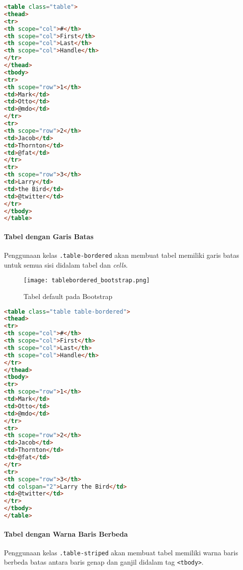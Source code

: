 \begin{lstlisting}[language=HTML,  basicstyle=\ttfamily, frame=single, columns=fullflexible, keepspaces=true, breaklines=true, showstringspaces=false, label={lst:tableBootstrap}, caption=Tabel pada bootstrap 4] 
<table class="table">
<thead>
<tr>
<th scope="col">#</th>
<th scope="col">First</th>
<th scope="col">Last</th>
<th scope="col">Handle</th>
</tr>
</thead>
<tbody>
<tr>
<th scope="row">1</th>
<td>Mark</td>
<td>Otto</td>
<td>@mdo</td>
</tr>
<tr>
<th scope="row">2</th>
<td>Jacob</td>
<td>Thornton</td>
<td>@fat</td>
</tr>
<tr>
<th scope="row">3</th>
<td>Larry</td>
<td>the Bird</td>
<td>@twitter</td>
</tr>
</tbody>
</table>
\end{lstlisting}

\paragraph{Tabel dengan Garis Batas}
Penggunaan kelas \texttt{.table-bordered} akan membuat tabel memiliki garis batas untuk semua sisi didalam tabel dan \textit{cells}.

\begin{figure} [H]
	\centering  
	\texttt{[image: tablebordered\_bootstrap.png]}  
	\caption{Tabel default pada Bootstrap} 
	\label{fig:tableBorderedBootstrap}
\end{figure}

\begin{lstlisting}[language=HTML,  basicstyle=\ttfamily, frame=single, columns=fullflexible, keepspaces=true, breaklines=true, showstringspaces=false, label={lst:tableborderedBootstrap}, caption=Kode tabel dengan garis batas pada bootstrap 4] 
<table class="table table-bordered">
<thead>
<tr>
<th scope="col">#</th>
<th scope="col">First</th>
<th scope="col">Last</th>
<th scope="col">Handle</th>
</tr>
</thead>
<tbody>
<tr>
<th scope="row">1</th>
<td>Mark</td>
<td>Otto</td>
<td>@mdo</td>
</tr>
<tr>
<th scope="row">2</th>
<td>Jacob</td>
<td>Thornton</td>
<td>@fat</td>
</tr>
<tr>
<th scope="row">3</th>
<td colspan="2">Larry the Bird</td>
<td>@twitter</td>
</tr>
</tbody>
</table>
\end{lstlisting}

\paragraph{Tabel dengan Warna Baris Berbeda}
Penggunaan kelas \texttt{.table-striped} akan membuat tabel memiliki warna baris berbeda batas antara baris genap dan ganjil didalam tag \texttt{<tbody>}.

